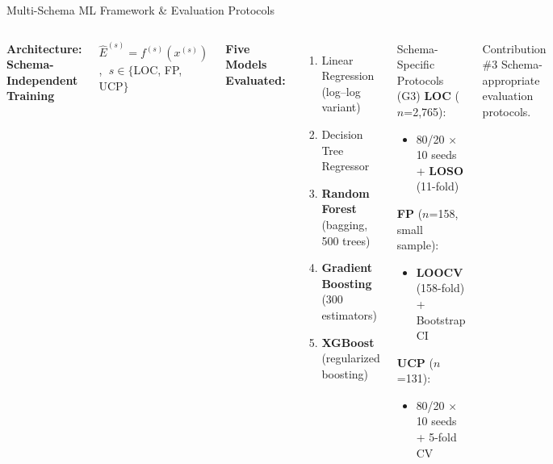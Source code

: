 \documentclass[aspectratio=169]{beamer}
\begin{document}
\begin{frame}{Multi-Schema ML Framework \& Evaluation Protocols}
\begin{columns}[T]
\textbf{Architecture: Schema-Independent Training}

$\hat{E}^{(s)} = f^{(s)}(x^{(s)})$, $\;s\in\{$LOC, FP, UCP$\}$

\vspace{0.1cm}
\textbf{Five Models Evaluated:}
\begin{enumerate}\small
    \item Linear Regression (log--log variant)
    \item Decision Tree Regressor
    \item \textbf{Random Forest} (bagging, 500 trees)
    \item \textbf{Gradient Boosting} (300 estimators)
    \item \textbf{XGBoost} (regularized boosting)
\end{enumerate}

\begin{block}{Schema-Specific Protocols (G3)}
\small\textbf{LOC} ($n$=2,765):
\begin{itemize}\small
    \item 80/20 $\times$ 10 seeds + \textbf{LOSO} (11-fold)
\end{itemize}
\textbf{FP} ($n$=158, small sample):
\begin{itemize}\small
    \item \textbf{LOOCV} (158-fold) + Bootstrap CI
\end{itemize}
\textbf{UCP} ($n$=131):
\begin{itemize}\small
    \item 80/20 $\times$ 10 seeds + 5-fold CV
\end{itemize}
\end{block}

\vspace{0.05cm}
\begin{alertblock}{Contribution \#3}
\small Schema-appropriate evaluation protocols.
\end{alertblock}
\end{columns}
\end{frame}
\end{document}
